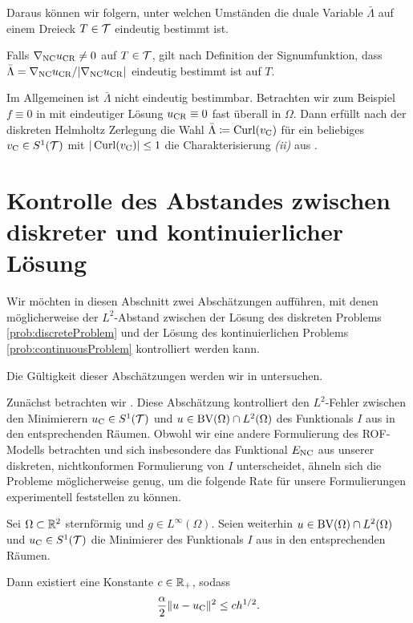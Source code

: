 Daraus können wir folgern, unter welchen Umständen die duale Variable
$\bar\Lambda$ auf einem Dreieck $T\in\mathcal{T}$ eindeutig bestimmt ist.

\begin{remark}
  Falls $\nabla_\textup{NC}u_\textup{CR}\neq 0$ auf $T\in\mathcal{T}$, gilt nach Definition der
  Signumfunktion, dass $\bar\Lambda=\nabla_\textup{NC}u_\textup{CR}/|\nabla_\textup{NC}u_\textup{CR}|$ eindeutig
  bestimmt ist auf $T$.

  Im Allgemeinen ist $\bar\Lambda$ nicht eindeutig bestimmbar. 
  Betrachten wir zum Beispiel $f\equiv 0$ in  mit
  eindeutiger Lösung $u_\textup{CR}\equiv 0$ fast überall in $\Omega$. 
  Dann erfüllt nach der diskreten Helmholtz Zerlegung \cite[S. 193, Theorem
  3.32]{Car09b} die Wahl $\bar\Lambda\coloneqq \operatorname{Curl}(v_{\textup{C}})$ für ein beliebiges
  $v_{\textup{C}}\in S^1(\mathcal{T})$ mit $|\operatorname{Curl}(v_{\textup{C}})|\leq 1$ die Charakterisierung
  \textit{(ii)} aus .
\end{remark}


\section{Kontrolle des Abstandes zwischen diskreter und kontinuierlicher
Lösung}
Wir möchten in diesen Abschnitt zwei Abschätzungen aufführen, mit denen
möglicherweise der $L^2$-Abstand zwischen der Lösung des diskreten Problems
\ref{prob:discreteProblem} und der Lösung des kontinuierlichen Problems
\ref{prob:continuousProblem} kontrolliert werden kann.

Die Gültigkeit dieser Abschätzungen werden wir in 
untersuchen.

Zunächst betrachten wir \cite[S. 309, Theorem 10.7]{Bar15}. Diese
Abschätzung kontrolliert den
$L^2$-Fehler zwischen den Minimierern $u_{\textup{C}}\in S^1(\mathcal{T})$ und
$u\in\textup{BV}(\Omega)\cap L^2(\Omega)$ des Funktionals $I$ aus  in
den entsprechenden Räumen. Obwohl wir eine andere Formulierung des ROF-Modells 
betrachten und sich insbesondere das Funktional $E_\textup{NC}$ aus unserer diskreten,
nichtkonformen Formulierung von $I$ unterscheidet, ähneln sich die 
Probleme möglicherweise genug, um die folgende Rate für unsere Formulierungen
experimentell feststellen zu können.

\begin{theorem}
  \label{thm:errorEstimateCourant}
  Sei $\Omega\subset\mathbb{R}^2$ sternförmig und $g\in L^\infty(\Omega)$.  Seien
  weiterhin $u\in\textup{BV}(\Omega)\cap L^2(\Omega)$ und $u_{\textup{C}}\in S^1(\mathcal{T})$ die
  Minimierer des Funktionals $I$ aus  in den entsprechenden
  Räumen.

  Dann existiert eine Konstante $c\in\mathbb{R}_+$, sodass
  \begin{align*}
    \frac{\alpha}{2}\Vert u-u_{\textup{C}}\Vert^2\leq
    ch^{1/2}.
  \end{align*}
\end{theorem}

